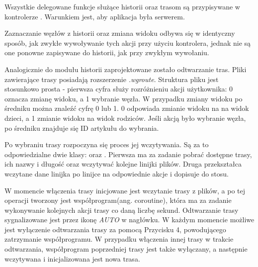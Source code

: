 Wszystkie delegowane funkcje służące historii oraz trasom są przypisywane w kontrolerze  . Warunkiem jest, aby aplikacja była serwerem.

Zaznaczanie węzłów z historii oraz zmiana widoku odbywa się w identyczny sposób, jak zwykłe wywoływanie tych akcji przy użyciu kontrolera, jednak nie są one ponowne zapisywane do historii, jak przy zwykłym wywołaniu.

Analogicznie do modułu historii zaprojektowane zostało odtwarzanie tras. Pliki zawierające trasy posiadają rozszerzenie \textit{.wgroute}. Struktura pliku jest stosunkowo prosta - pierwsza cyfra służy rozróżnieniu akcji użytkownika: 0 oznacza zmianę widoku, a 1 wybranie węzła. W przypadku zmiany widoku po średniku można znaleźć cyfrę 0 lub 1. 0 odpowiada zmianie widoku na na widok dzieci, a 1 zmianie widoku na widok rodziców. Jeśli akcją było wybranie węzła, po średniku znajduje się ID artykułu do wybrania. 



Po wybraniu trasy rozpoczyna się proces jej wczytywania. Są za to odpowiedzialne dwie klasy:   oraz  . Pierwsza ma za zadanie pobrać dostępne trasy, ich nazwy i długość oraz wczytywać kolejne linijki plików. Druga przekształca wczytane dane linijka po linijce na odpowiednie akcje i dopisuje do stosu.

W momencie włączenia trasy inicjowane jest wczytanie trasy z plików, a po tej operacji tworzony jest współprogram(ang. coroutine), która ma za zadanie wykonywanie kolejnych akcji trasy co daną liczbę sekund. Odtwarzanie trasy sygnalizowane jest przez ikonę \textit{AUTO} w nagłówku. W każdym momencie możliwe jest wyłączenie odtwarzania trasy za pomocą Przycisku 4, powodującego zatrzymanie współprogramu. W przypadku włączenia innej trasy w trakcie odtwarzania, współprogram poprzedniej trasy jest także wyłączany, a następnie wczytywana i inicjalizowana jest nowa trasa. 
